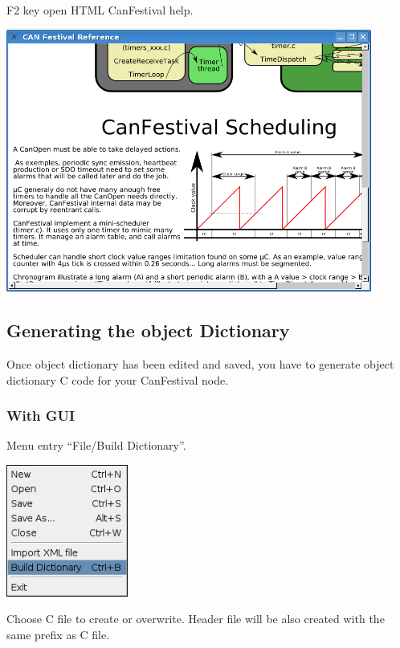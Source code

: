 \documentclass[12pt,english,a4paper]{book}
\begin{document}
F2 key open HTML CanFestival help.

\begin{center}
\includegraphics[width=12cm]{Pictures/10000201000003440000025ACC3FD2F1} 
\par\end{center}


\subsection{Generating the object Dictionary}

Once object dictionary has been edited and saved, you have to generate
object dictionary C code for your CanFestival node.


\subsubsection{With GUI}

Menu entry {}``File/Build Dictionary''.

\begin{center}
\includegraphics[width=4cm]{Pictures/10000201000000B7000000C66AF89CD5} 
\par\end{center}

Choose C file to create or overwrite. Header file will be also created
with the same prefix as C file.
\end{document}
